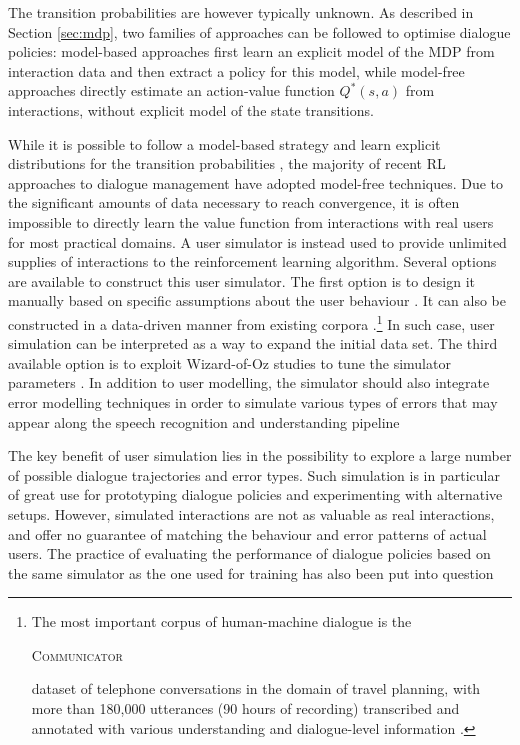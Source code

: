 The transition probabilities are however typically unknown.  As described in Section \ref{sec:mdp}, two families of approaches can be followed to optimise dialogue policies: model-based approaches first learn an explicit model of the MDP from interaction data and then extract a policy for this model, while model-free approaches directly estimate an action-value function $Q^*(s,a)$ from interactions, without explicit model of the state transitions.  

While it is possible to follow a model-based strategy and learn explicit distributions for the transition probabilities \citep{SinghLKW02,tetreault2006using}, the majority of recent RL approaches to dialogue management have adopted model-free techniques. Due to the significant amounts of data necessary to reach convergence, it is often impossible to directly learn the value function from interactions with real users for most practical domains.  A user simulator is instead used to provide unlimited supplies of interactions to the reinforcement learning algorithm.   Several options are available to construct this user simulator.  The first option is to design it manually based on specific assumptions about the user behaviour \citep{Pietquin:2006,Schatzmann:2007:AUS:1614108.1614146}.  It can also be constructed in a data-driven manner from existing corpora \citep{GeorgilaHL06}.\footnote{The most important corpus of human-machine dialogue is the \begin{small}\textsc{Communicator}\end{small} dataset of telephone conversations in the domain of travel planning, with more than 180,000 utterances (90 hours of recording) transcribed and annotated with various understanding and dialogue-level information \citep{BennettR02}.}  In such case, user simulation can be interpreted as a way to expand the initial data set.  The third available option is to exploit  Wizard-of-Oz studies to tune the simulator parameters \citep{Rieser:2010:LHM:1735495.1735497}.  In addition to user modelling, the simulator should also integrate error modelling techniques in order to simulate various types of errors that may appear along the speech recognition and understanding pipeline \citep{SchatzmannTY07,ThomsonGHTY12}

The key benefit of user simulation lies in the possibility to explore a large number of possible dialogue trajectories and error types.  Such simulation is in particular of great use for prototyping dialogue policies and experimenting with alternative setups. However, simulated interactions are not as valuable as real interactions, and offer no guarantee of matching the behaviour and error patterns of actual users.  The practice of evaluating the performance of dialogue policies based on the same simulator as the one used for training has also been put into question \citep{paek2006}

